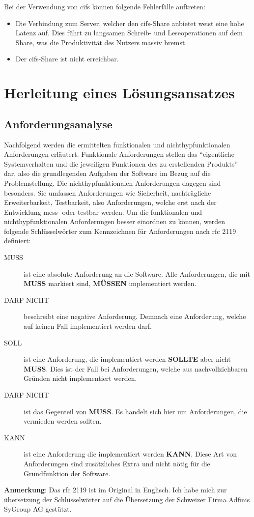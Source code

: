 \documentclass[titlepage]{report}
\begin{document}
Bei der Verwendung von \gls{cifs} können folgende Fehlerfälle auftreten:
\begin{itemize}
    \item Die Verbindung zum Server, welcher den \gls{cifs}\hyp{}Share
          anbietet weist eine hohe Latenz auf. Dies führt zu langsamen
          Schreib\hyp{} und Leseoperationen auf dem Share, was die
          Produktivität des Nutzers massiv bremst.
    \item Der \gls{cifs}\hyp{}Share ist nicht erreichbar.
\end{itemize}
\chapter*{Herleitung eines Lösungsansatzes}
\section*{Anforderungsanalyse}
Nachfolgend werden die ermittelten funktionalen und nichthyp{}funktionalen
Anforderungen erläutert. Funktionale Anforderungen stellen das
``eigentliche Systemverhalten und die jeweiligen Funktionen des zu
erstellenden Produkts''\cite[S. 20]{BPSE} dar, also die grundlegenden
Aufgaben der Software im Bezug auf die Problemstellung. Die
nichthyp{}funktionalen Anforderungen dagegen sind besonders. Sie umfassen
Anforderungen wie Sicherheit, nachträgliche Erweiterbarkeit,
Testbarkeit, also Anforderungen, welche erst nach der Entwicklung
mess\hyp{} oder testbar werden\cite[S. 292]{SNFA}. Um die funktionalen
und nichthyp{}funktionalen Anforderungen besser einordnen zu können, werden
folgende Schlüsselwörter zum Kennzeichnen für Anforderungen nach
\gls{rfc} 2119\cite{RFC2119} definiert:
\begin{description}
    \item[MUSS] ist eine absolute Anforderung an die Software. Alle
        Anforderungen, die mit \textbf{MUSS} markiert sind,
        \textbf{MÜSSEN} implementiert werden.
    \item[DARF NICHT] beschreibt eine negative Anforderung. Demnach eine
        Anforderung, welche auf keinen Fall implementiert werden darf.
    \item[SOLL] ist eine Anforderung, die implementiert werden
        \textbf{SOLLTE} aber nicht \textbf{MUSS}. Dies ist der Fall bei
        Anforderungen, welche aus nachvollziehbaren Gründen nicht
        implementiert werden.
    \item[DARF NICHT] ist das Gegenteil von \textbf{MUSS}. Es
        handelt sich hier um Anforderungen, die vermieden werden sollten.
    \item[KANN] ist eine Anforderung die implementiert werden
        \textbf{KANN}. Diese Art von Anforderungen sind
        zusätzliches Extra und nicht nötig für die Grundfunktion der
        Software.
\end{description}
\textbf{Anmerkung}: Das \gls{rfc} 2119 ist im Original in Englisch. Ich
habe mich zur übersetzung der Schlüsselwörter auf die Übersetzung der
Schweizer Firma Adfinis SyGroup AG gestützt\cite{RFC2119DE}.
\end{document}

